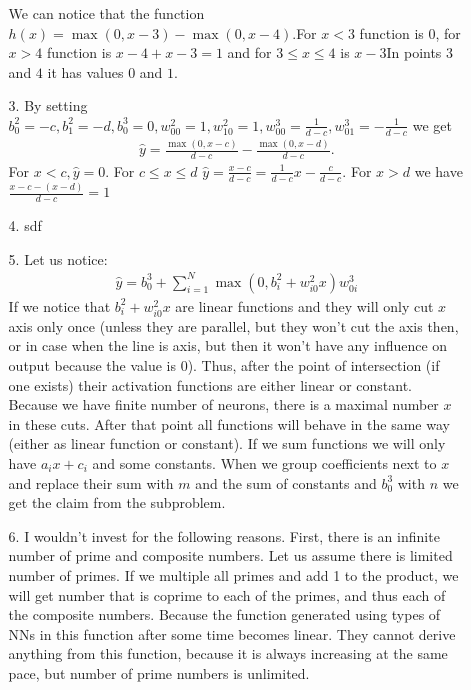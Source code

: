 \documentclass[10pt,a4paper]{article}
\begin{document}
\begin{enumerate}
\begin{enumerate}
We can notice that the function 
$h(x) = \max(0, x-3) - \max(0, x - 4)$.For $x<3$ function is 0, for $x> 4$ function is $x-4 + x-3 = 1$ and for $3\leq x\leq4$  is $x-3$In points $3$ and $4$ it has values $0$ and $1$.
\item[3.]
By setting $b_0^2=-c, b_1^2=-d, b_0^3=0, w_{00}^2=1, w_{10}^2=1, w_{00}^3=\frac{1}{d-c}, w_{01}^3=-\frac{1}{d-c}$ we get 
\begin{align*}
\hat{y} = \frac{\max(0, x-c)}{d-c} - \frac{\max(0, x-d)}{d-c}.
\end{align*} 
For $x<c, \hat{y}=0$. 
For $c\leq x\leq d$ $\hat{y}=\frac{x-c}{d-c}=\frac{1}{d-c}x - \frac{c}{d-c}$. For $x > d$ we have $\frac{x-c - (x - d)}{d-c}=1$
\item[4.]
sdf
\item[5.]
Let us notice:
\begin{align*}
\hat{y} = b_0^3 + \sum_{i=1}^N\max(0, b_i^2+w_{i0}^2x)w^3_{0i}
\end{align*}
If we notice that $ b_i^2+w_{i0}^2x$ are linear functions and they will only cut $x$ axis only once (unless they are parallel, but they won't cut the axis then, or in case when the line is axis, but then it won't have any influence on output because the value is 0). Thus, after the point of intersection (if one exists) their activation functions are either linear or constant. Because we have finite number of neurons, there is a maximal number $x$ in these cuts. After that point all functions will behave in the same way (either as linear function or constant). 
If we sum functions we will only have $a_ix + c_i$ and some constants. When we group coefficients next to $x$ and replace their sum with $m$ and the sum of constants and $b^3_0$ with $n$ we get the claim from the subproblem.
\item[6.]
I wouldn't invest for the following reasons. 
First, there is an infinite number of prime and composite numbers. Let us assume there is limited number of primes. If we multiple all primes and add 1 to the product, we will get number that is coprime to each of the primes, and thus each of the composite numbers. 
Because the function generated using types of NNs in this function after some time becomes linear. They cannot derive anything from this function, because it is always increasing at the same pace, but number of prime numbers is unlimited.
\end{enumerate}
\end{enumerate}
\end{document}
